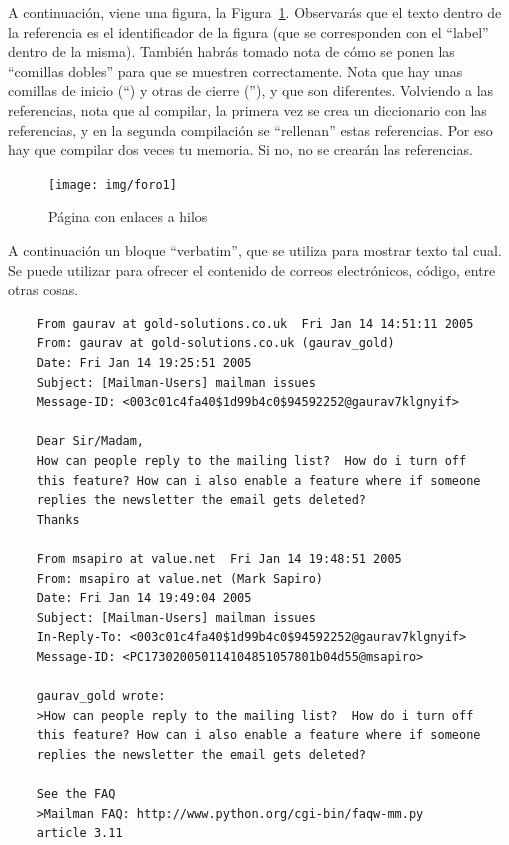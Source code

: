 \documentclass[a4paper, 12pt]{book}
\begin{document}
A continuación, viene una figura, la Figura~\ref{figura:foro_hilos}. 
Observarás que el texto dentro de la referencia es el identificador de la figura (que se corresponden con el ``label'' dentro de la misma). 
También habrás tomado nota de cómo se ponen las ``comillas dobles'' para que se muestren correctamente. 
Nota que hay unas comillas de inicio (``) y otras de cierre (''), y que son diferentes.
Volviendo a las referencias, nota que al compilar, la primera vez se crea un diccionario con las referencias, y en la segunda compilación se ``rellenan'' estas referencias. 
Por eso hay que compilar dos veces tu memoria.
Si no, no se crearán las referencias.

 \begin{figure}
    \centering
    \texttt{[image: img/foro1]}
    \caption{Página con enlaces a hilos}
    \label{figura:foro_hilos}
 \end{figure}

A continuación un bloque ``verbatim'', que se utiliza para mostrar texto tal cual.
Se puede utilizar para ofrecer el contenido de correos electrónicos, código, entre otras cosas.

{\footnotesize
\begin{verbatim}
    From gaurav at gold-solutions.co.uk  Fri Jan 14 14:51:11 2005
    From: gaurav at gold-solutions.co.uk (gaurav_gold)
    Date: Fri Jan 14 19:25:51 2005
    Subject: [Mailman-Users] mailman issues
    Message-ID: <003c01c4fa40$1d99b4c0$94592252@gaurav7klgnyif>

    Dear Sir/Madam,
    How can people reply to the mailing list?  How do i turn off
    this feature? How can i also enable a feature where if someone
    replies the newsletter the email gets deleted?
    Thanks

    From msapiro at value.net  Fri Jan 14 19:48:51 2005
    From: msapiro at value.net (Mark Sapiro)
    Date: Fri Jan 14 19:49:04 2005
    Subject: [Mailman-Users] mailman issues
    In-Reply-To: <003c01c4fa40$1d99b4c0$94592252@gaurav7klgnyif>
    Message-ID: <PC173020050114104851057801b04d55@msapiro>

    gaurav_gold wrote:
    >How can people reply to the mailing list?  How do i turn off
    this feature? How can i also enable a feature where if someone
    replies the newsletter the email gets deleted?

    See the FAQ
    >Mailman FAQ: http://www.python.org/cgi-bin/faqw-mm.py
    article 3.11
\end{verbatim}
}
\end{document}
